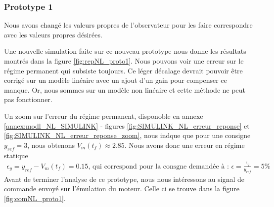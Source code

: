 \subsubsection{Prototype 1}
Nous avons changé les valeurs propres de l'observateur pour les faire correspondre avec les valeurs propres désirées. 		
			
Une nouvelle simulation faite sur ce nouveau prototype nous donne les résultats montrés dans la figure \ref{fig:repNL_proto1}. Nous pouvons voir une erreur sur le régime permanent qui subsiste toujours. Ce léger décalage devrait pouvoir être corrigé sur un modèle linéaire avec un ajout d'un gain pour compenser ce manque. Or, nous sommes sur un modèle non linéaire et cette méthode ne peut pas fonctionner.


Un zoom sur l'erreur du régime permanent, disponoble en annexe \ref{annex:modl_NL_SIMULINK} - figures \ref{fig:SIMULINK_NL_erreur_reponse} et \ref{fig:SIMULINK_NL_erreur_reponse_zoom}, nous indque que pour une consigne $y_{ref} = 3$, nous obtenons $V_m(t_f)\approx 2.85$. Nous avons donc une erreur en régime statique \begin{align*}
\epsilon_y = y_{ref}-V_m(t_f) = 0.15 \text{, qui correspond pour la consgne demandée à : } \epsilon = \frac{\epsilon_y}{y_{ref}} = 5\%
\end{align*}
Avant de terminer l'analyse de ce prototype, nous nous intéressons au signal de commande envoyé sur l'émulation du moteur. Celle ci se trouve dans la figure \ref{fig:comNL_proto1}. 

